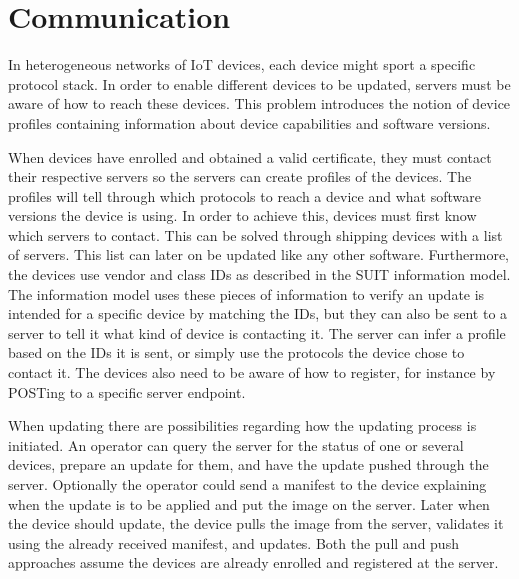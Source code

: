 \documentclass[0-thesis.tex]{subfiles}
\begin{document}
\section{Communication}
\label{sec:communication}
In heterogeneous networks of IoT devices, each device might sport a specific protocol
stack. In order to enable different devices to be updated, servers must be aware of how to
reach these devices. This problem introduces the notion of device profiles containing
information about device capabilities and software versions. 

When devices have enrolled and obtained a valid certificate, they must contact their
respective servers so the servers can create profiles of the devices. The profiles will
tell through which protocols to reach a device and what software versions the device is
using. In order to achieve this, devices must first know which servers to contact. This
can be solved through shipping devices with a list of servers. This list can later on be
updated like any other software. Furthermore, the devices use vendor and class IDs as
described in the SUIT information model. The information model uses these pieces of
information to verify an update is intended for a specific device by matching the IDs, but
they can also be sent to a server to tell it what kind of device is contacting it. The
server can infer a profile based on the IDs it is sent, or simply use the protocols the
device chose to contact it. The devices also need to be aware of how to register, for
instance by POSTing to a specific server endpoint. 

When updating there are possibilities regarding how the updating process is initiated. An
operator can query the server for the status of one or several devices, prepare an update
for them, and have the update pushed through the server. Optionally the operator could
send a manifest to the device explaining when the update is to be applied and put the
image on the server. Later when the device should update, the device pulls the image from
the server, validates it using the already received manifest, and updates. Both the pull
and push approaches assume the devices are already enrolled and registered at the server.
\end{document}
